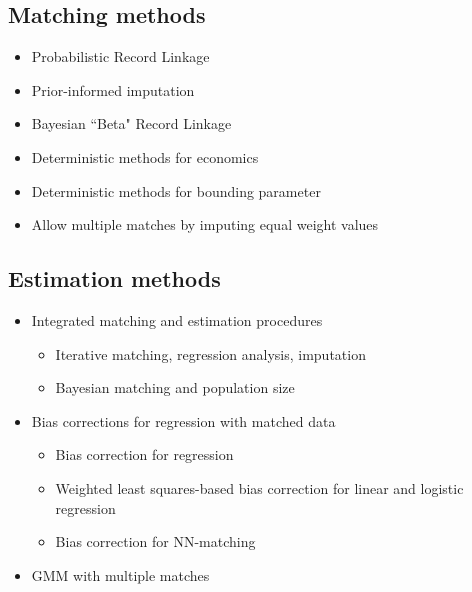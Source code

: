 \documentclass[12pt]{article}
\begin{document}
\subsection*{Matching methods}
\begin{itemize}
\item Probabilistic Record Linkage \citep{fellegi69, arp2018}
\item Prior-informed imputation \citep{Goldstein2012} 
\item Bayesian ``Beta" Record Linkage \citep{sadinle2017} 
\item Deterministic methods for economics  \citep{ferrie96, abe2012, abe2017}
\item Deterministic methods for bounding parameter \citep{nq2015}
\item Allow multiple matches by imputing equal weight values \citep{bleakley2016}


\end{itemize}

\subsection*{Estimation methods}
\begin{itemize}
\item Integrated matching and estimation procedures 
\begin{itemize}
\item Iterative matching, regression analysis, imputation \citep{sw1997}
\item  Bayesian matching and population size \citep{tancredi_liseo_2015}
\end{itemize}
\item Bias corrections for regression with matched data 
\begin{itemize}
\item Bias correction for regression \citep{sw1993, lahiri05} 
\item Weighted least squares-based bias correction for linear and logistic regression \citep{hof2012}
\item Bias correction for NN-matching \citep{hirukawa2018}
\end{itemize}
\item GMM with multiple matches \citep{ahl2019}
\end{itemize}


\newpage
\singlespacing
 

\end{document}
